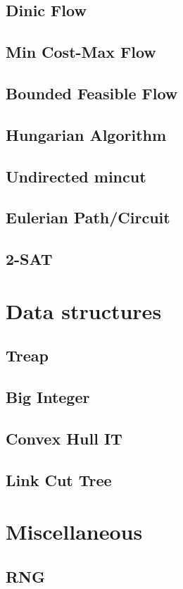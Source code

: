 \subsection{Dinic Flow}
\raggedbottom
\hrulefill
\subsection{Min Cost-Max Flow}
\raggedbottom
\hrulefill
\subsection{Bounded Feasible Flow}
\raggedbottom
\hrulefill
\subsection{Hungarian Algorithm}
\raggedbottom
\hrulefill
\subsection{Undirected mincut}
\raggedbottom
\hrulefill
\subsection{Eulerian Path/Circuit}
\raggedbottom
\hrulefill
\subsection{2-SAT}
\raggedbottom
\hrulefill

\section{Data structures}
\subsection{Treap}
\raggedbottom
\hrulefill
\subsection{Big Integer}
\raggedbottom
\hrulefill
\subsection{Convex Hull IT}
\raggedbottom
\hrulefill
\subsection{Link Cut Tree}
\raggedbottom
\hrulefill

\section{Miscellaneous}
\subsection{RNG}
\raggedbottom
\hrulefill

